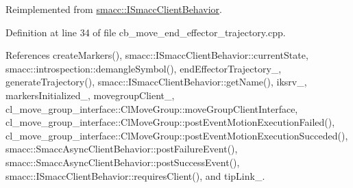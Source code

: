 Reimplemented from \hyperlink{classsmacc_1_1ISmaccClientBehavior_a3ec24a839087c550e1d62a81e48cf530}{smacc\+::\+I\+Smacc\+Client\+Behavior}.



Definition at line 34 of file cb\+\_\+move\+\_\+end\+\_\+effector\+\_\+trajectory.\+cpp.



References create\+Markers(), smacc\+::\+I\+Smacc\+Client\+Behavior\+::current\+State, smacc\+::introspection\+::demangle\+Symbol(), end\+Effector\+Trajectory\+\_\+, generate\+Trajectory(), smacc\+::\+I\+Smacc\+Client\+Behavior\+::get\+Name(), iksrv\+\_\+, markers\+Initialized\+\_\+, movegroup\+Client\+\_\+, cl\+\_\+move\+\_\+group\+\_\+interface\+::\+Cl\+Move\+Group\+::move\+Group\+Client\+Interface, cl\+\_\+move\+\_\+group\+\_\+interface\+::\+Cl\+Move\+Group\+::post\+Event\+Motion\+Execution\+Failed(), cl\+\_\+move\+\_\+group\+\_\+interface\+::\+Cl\+Move\+Group\+::post\+Event\+Motion\+Execution\+Succeded(), smacc\+::\+Smacc\+Async\+Client\+Behavior\+::post\+Failure\+Event(), smacc\+::\+Smacc\+Async\+Client\+Behavior\+::post\+Success\+Event(), smacc\+::\+I\+Smacc\+Client\+Behavior\+::requires\+Client(), and tip\+Link\+\_\+.


